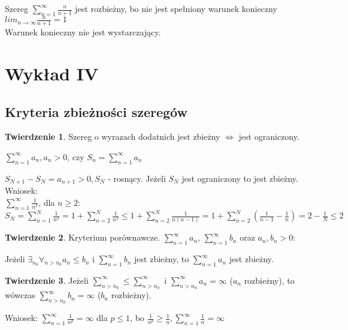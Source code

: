 \documentclass{article}
\theoremstyle{definition}
\theoremstyle{definition}
\newtheorem{tw}{Twierdzenie}[subsection]
\theoremstyle{definition}
\theoremstyle{definition}
\begin{document}
Szereg $\sum_{n=1}^{\infty} \frac{n}{n+1}$ jest rozbieżny, bo nie jest spełniony warunek konieczny\\ $lim_{n\rightarrow \infty} \frac{n}{n+1}=1$\\
Warunek konieczny nie jest wystarczający.

\section{Wykład IV}

\subsection{Kryteria zbieżności szeregów}

\begin{tw}
    Szereg o wyrazach dodatnich jest zbieżny $\iff$ jest ograniczony.\\
    \begin{center}
        $\sum_{n=1}^{\infty} a_n, a_n>0$, czy $S_n = \sum_{n=1}^{\infty} a_n$
    \end{center}
    $S_{N+1}-S_{N}=a_{n+1} > 0, S_N$ - rosnący. Jeżeli $S_N$ jest ograniczony to jest zbieżny.\\
    Wniosek:\\
    $\sum_{n=1}^{\infty} \frac{1}{n^2}$, dla $n\geq 2$:\\
    $S_N=\sum_{n=1}^{N} \frac{1}{n^2}=1+\sum_{n=2}^{N} \frac{1}{n^2}\leq 1 + \sum_{n=2}^{N} \frac{1}{n(n-1)} = 1 + \sum_{n=2}^{N} (\frac{1}{n-1} - \frac{1}{n}) = 2 - \frac{1}{N} \leq 2$
\end{tw}

\begin{tw}
    Kryterium porównawcze. $\sum_{n=1}^{\infty} a_n$, $\sum_{n=1}^{\infty} b_n$ oraz $a_n, b_n > 0$:
    \begin{center}
    Jeżeli $\exists_{n_0}\forall_{n>n_0} a_n\leq b_n$ i $\sum_{n=1}^{\infty} b_n$ jest zbieżny, to $\sum_{n=1}^{\infty} a_n$ jest zbieżny.\\
    \end{center}
\end{tw}

\begin{tw}
    Jeżeli $\sum_{n>n_0}^{\infty} \leq \sum_{n>n_0}^{\infty}$ i $\sum_{n>n_0}^{\infty} a_n = \infty$ ($a_n$ rozbieżny),
    to wówczas $\sum_{n>n_0}^{\infty} b_n = \infty$ ($b_n$ rozbieżny).
\end{tw}

Wniosek: $\sum_{n=1}^{\infty} \frac{1}{n^p} = \infty$ dla $p\leq 1$, bo $\frac{1}{n^p} \geq \frac{1}{n}, \sum_{n=1}^{\infty} \frac{1}{n} = \infty$\\
\end{document}
